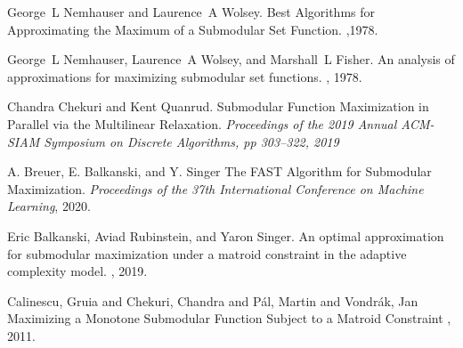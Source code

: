 \documentclass[11pt, a4paper]{article}
\begin{document}
\begin{thebibliography}{99}
    George~L Nemhauser and Laurence~A Wolsey.
	\newblock Best Algorithms for Approximating the Maximum of a Submodular Set Function.
	,1978.
	
    George~L Nemhauser, Laurence~A Wolsey, and Marshall~L Fisher.
    \newblock An analysis of approximations for maximizing submodular set functions.
    , 1978.

     Chandra Chekuri and Kent Quanrud.
	\newblock Submodular Function Maximization in Parallel via the Multilinear Relaxation.
	\newblock \emph{Proceedings of the 2019 Annual ACM-SIAM Symposium on Discrete Algorithms, pp 303--322, 2019}

     A. Breuer, E. Balkanski, and Y. Singer
	\newblock The FAST Algorithm for Submodular Maximization.
	\newblock \emph{Proceedings of the 37th International Conference on Machine Learning}, 2020.
	
	 Eric Balkanski, Aviad Rubinstein, and Yaron Singer.
	\newblock An optimal approximation for submodular maximization under a matroid constraint in the adaptive complexity model.
	, 2019.
	
	 Calinescu, Gruia and Chekuri, Chandra and Pál, Martin and Vondrák, Jan
	\newblock Maximizing a Monotone Submodular Function Subject to a Matroid Constraint
	, 2011.
	

\end{thebibliography}
\end{document}
